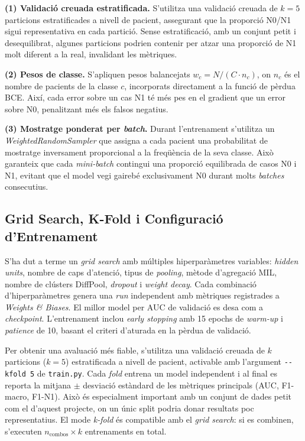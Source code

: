 \documentclass[10pt,a4paper,twocolumn,twoside]{article}
\begin{document}
\textbf{(1) Validació creuada estratificada.} S'utilitza una validació creuada de $k\!=\!5$ particions
estratificades a nivell de pacient, assegurant que la proporció N0/N1 sigui representativa en cada
partició. Sense estratificació, amb un conjunt petit i desequilibrat, algunes particions podrien
contenir per atzar una proporció de N1 molt diferent a la real, invalidant les mètriques.

\textbf{(2) Pesos de classe.} S'apliquen pesos balancejats $w_c = N / (C \cdot n_c)$, on $n_c$ és el
nombre de pacients de la classe $c$, incorporats directament a la funció de pèrdua BCE. Així, cada error
sobre un cas N1 té més pes en el gradient que un error sobre N0, penalitzant més els falsos negatius.

\textbf{(3) Mostratge ponderat per \textit{batch}.} Durant l'entrenament s'utilitza un
\textit{WeightedRandomSampler} que assigna a cada pacient una probabilitat de mostratge inversament
proporcional a la freqüència de la seva classe. Això garanteix que cada \textit{mini-batch} contingui una
proporció equilibrada de casos N0 i N1, evitant que el model vegi gairebé exclusivament N0 durant molts
\textit{batches} consecutius.

\subsection{Grid Search, K-Fold i Configuració d'Entrenament}

S'ha dut a terme un \textit{grid search} amb múltiples hiperparàmetres variables: \textit{hidden units}, nombre
de caps d'atenció, tipus de \textit{pooling}, mètode d'agregació MIL, nombre de clústers DiffPool,
\textit{dropout} i \textit{weight decay}. Cada combinació d'hiperparàmetres genera una \textit{run} independent
amb mètriques registrades a \textit{Weights \& Biases}. El millor model per AUC de validació es desa com a
\textit{checkpoint}. L'entrenament inclou \textit{early stopping} amb 15 epochs de \textit{warm-up} i
\textit{patience} de 10, basant el criteri d'aturada en la pèrdua de validació.

Per obtenir una avaluació més fiable, s'utilitza una validació creuada de $k$ particions ($k=5$)
estratificada a nivell de pacient, activable amb l'argument \texttt{-{}-kfold~5} de \texttt{train.py}.
Cada \textit{fold} entrena un model independent i al final es reporta la mitjana $\pm$ desviació estàndard
de les mètriques principals (AUC, F1-macro, F1-N1). Això és especialment important amb un conjunt
de dades petit com el d'aquest projecte, on un únic split podria donar resultats poc representatius.
El mode \textit{k-fold} és compatible amb el \textit{grid search}: si es combinen, s'executen
$n_{\text{combos}} \times k$ entrenaments en total.
\end{document}
